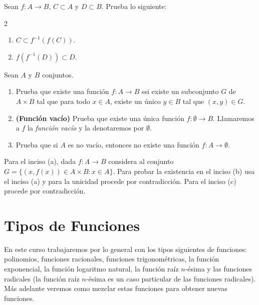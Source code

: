 \documentclass[12pt,a4paper]{book}
\begin{document}
    \begin{ejercicio}\label{ej:84}
        Sean $f:A\to B$, $C\subset A$ y $D\subset B$. Prueba lo siguiente:
        \begin{multicols}{2}
        \begin{enumerate}[nosep]
            \item $C\subset f^{-1}(f(C))$.
            \item $f\left(f^{-1}(D)\right)\subset D$.
        \end{enumerate}
        \end{multicols}
    \end{ejercicio}

    \begin{ejercicio}\label{ej:85}
        Sean $A$ y $B$ conjuntos.
        \begin{enumerate}[nosep]
            \item Prueba que existe una función $f:A\to B$ ssi existe un subconjunto $G$ de
            $A\times B$ tal que para todo $x\in A$, existe un único $y\in B$ tal que $(x,y)\in G$.
            \item \textbf{(Función vacío)} Prueba que existe una única función $f:\emptyset\to B$. Llamaremos
            a $f$ la \textit{función vacío} y la denotaremos por $\emptyset$.
            \item Prueba que si $A$ es no vacío, entonces no existe una función $f:A\to\emptyset$.
        \end{enumerate}
        \sugerencia Para el inciso (a), dada $f:A\to B$ considera al conjunto
        $G=\{(x,f(x))\in A\times B:x\in A\}$. Para probar la existencia en el inciso (b)
        usa el inciso (a) y para la unicidad procede por contradicción. Para el inciso
        (c) procede por contradicción.
    \end{ejercicio}

    \section{Tipos de Funciones}

    En este curso trabajaremos por lo general con los tipos siguientes de funciones:
    polinomios, funciones racionales, funciones trigonométricas, la función
    exponencial, la función logaritmo natural, la función raíz $n$-ésima y las funciones
    radicales (la función raíz $n$-ésima es un caso particular de las funciones
    radicales). Más adelante veremos como mezclar estas funciones para obtener
    nuevas funciones.
\end{document}
